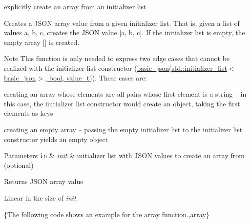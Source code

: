 explicitly create an array from an initializer list 

Creates a J\-S\-O\-N array value from a given initializer list. That is, given a list of values {\ttfamily a, b, c}, creates the J\-S\-O\-N value {\ttfamily \mbox{[}a, b, c\mbox{]}}. If the initializer list is empty, the empty array {\ttfamily \mbox{[}\mbox{]}} is created.

\begin{DoxyNote}{Note}
This function is only needed to express two edge cases that cannot be realized with the initializer list constructor (\hyperlink{classnlohmann_1_1basic__json_afeb998aec45296bc2050bd1c41ef41eb}{basic\-\_\-json(std\-::initializer\-\_\-list$<$basic\-\_\-json$>$, bool, value\-\_\-t)}). These cases are\-:
\begin{DoxyEnumerate}
\item creating an array whose elements are all pairs whose first element is a string -- in this case, the initializer list constructor would create an object, taking the first elements as keys
\item creating an empty array -- passing the empty initializer list to the initializer list constructor yields an empty object
\end{DoxyEnumerate}
\end{DoxyNote}

\begin{DoxyParams}[1]{Parameters}
\mbox{\tt in}  & {\em init} & initializer list with J\-S\-O\-N values to create an array from (optional)\\
\hline
\end{DoxyParams}
\begin{DoxyReturn}{Returns}
J\-S\-O\-N array value
\end{DoxyReturn}
Linear in the size of {\itshape init}.

\{The following code shows an example for the {\ttfamily array} function.,array\}

